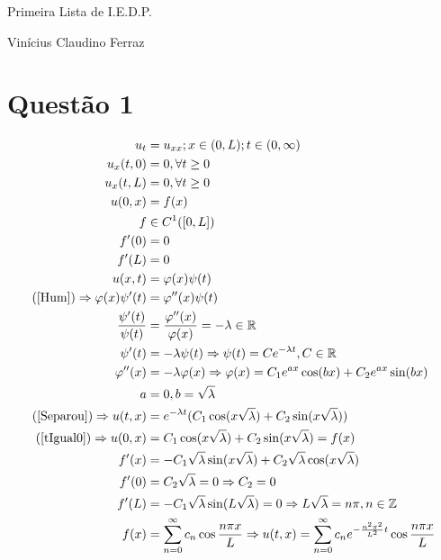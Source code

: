 \documentclass[12pt,a4paper]{article}
\date{}
\begin{document}
	\Large

	\begin{center}
		Primeira Lista de I.E.D.P.

		Vin\'icius Claudino Ferraz
	\end{center}

	\normalsize

	\section{Quest\~ao 1}
		\begin{align}
			u_t &= u_{xx} ; x \in (0, L) ; t \in (0, \infty) \label{Hum} \\
			u_x(t, 0) &= 0, \forall t \ge 0 \\
			u_x(t, L) &= 0, \forall t \ge 0 \\
			u(0, x) &= f(x) \label{tIgual0} \\
			f &\in C^1([0, L]) \\
			f'(0) &= 0 \\
			f'(L) &= 0 \\
			u(x, t) &= \varphi(x) \psi(t) \label{Separou} \\
			(\ref{Hum}) \Rightarrow \varphi(x) \psi'(t) &= \varphi''(x) \psi(t) \\
			\frac{\psi'(t)}{\psi(t)} &= \frac{\varphi''(x)}{\varphi(x)} = - \lambda \in \mathbb{R} \\
			\psi'(t) &= - \lambda \psi(t) \Rightarrow \psi(t) = C e^{- \lambda t}, C \in \mathbb{R} \\
			\varphi''(x) &= - \lambda \varphi(x) \Rightarrow \varphi(x) = C_1 e^{ax} \cos(bx) + C_2 e^{ax} \sin(bx) \\
			a &= 0, b = \sqrt{\lambda} \\
			(\ref{Separou}) \Rightarrow u(t, x) &= e^{- \lambda t} (C_1 \cos(x \sqrt{\lambda}) + C_2 \sin(x \sqrt{\lambda})) \\
			(\ref{tIgual0}) \Rightarrow u(0, x) &= C_1 \cos(x\sqrt{\lambda}) + C_2 \sin(x\sqrt{\lambda}) = f(x) \\
			f'(x) &= - C_1 \sqrt{\lambda} \sin(x\sqrt{\lambda}) + C_2 \sqrt{\lambda} \cos(x\sqrt{\lambda}) \\
			f'(0) &= C_2 \sqrt{\lambda} = 0 \Rightarrow C_2 = 0 \\
			f'(L) &= - C_1 \sqrt{\lambda} \sin(L\sqrt{\lambda}) = 0 \Rightarrow L \sqrt{\lambda} = n\pi, n \in \mathbb{Z} \\
			f(x) &= \sum_{n = 0}^\infty c_n \cos \frac{n \pi x}{L} \Rightarrow u(t, x) = \sum_{n = 0}^\infty c_n e^{- \frac{n^2\pi^2}{L^2} t} \cos \frac{n \pi x}{L}
		\end{align}
\end{document}
